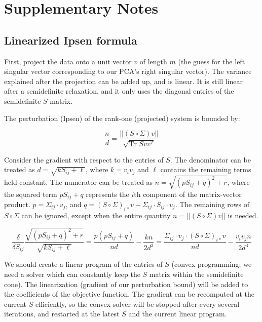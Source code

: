 \documentclass{article}
\begin{document}
\section{Supplementary Notes}

\subsection{Linearized Ipsen formula}

First, project the data onto a unit vector $v$ of length $m$ (the guess for the left singular vector corresponding to our PCA's right singular vector). The variance explained after the projection can be added up, and is linear. It is still linear after a semidefinite relaxation, and it only uses the diagonal entries of the semidefinite $S$ matrix.

The perturbation (Ipsen) of the rank-one (projected) system is bounded by:

$$
\frac{n}{d} = \frac{|| (S \circ \Sigma) v||}{\sqrt{\text{Tr }Svv^T}}
$$

Consider the gradient with respect to the entries of $S$. The denominator can be treated as $d = \sqrt{k S_{ij} + \ell}$, where $k = v_iv_j$ and $\ell$ contains the remaining terms held constant. The numerator can be treated as $n = \sqrt{(pS_{ij} + q)^2 + r}$, where the squared term $pS_{ij} + q$ represents the $i$th component of the matrix-vector product. $p = \Sigma_{ij} \cdot v_j$, and $q = (S \circ \Sigma)_{i*} v - \Sigma_{ij} \cdot S_{ij} \cdot v_j$. The remaining rows of $S \circ \Sigma$ can be ignored, except when the entire quantity $n = ||(S \circ \Sigma)v||$ is needed.

$$
\frac{\delta}{\delta S_{ij}}
\frac{\sqrt{(pS_{ij} + q)^2 + r}}{\sqrt{kS_{ij}+\ell}}
=
\frac{p(pS_{ij}+q)}{nd}
-
\frac{kn}{2d^3}
=
\frac{\Sigma_{ij} \cdot v_j \cdot (S \circ \Sigma)_{i*} v}{nd} - \frac{v_i v_j n}{2d^3}
$$

We should create a linear program of the entries of $S$ (convex programming; we need a solver which can constantly keep the $S$ matrix within the semidefinite cone). The linearization (gradient of our perturbation bound) will be added to the coefficients of the objective function. The gradient can be recomputed at the current $S$ efficiently, so the convex solver will be stopped after every several iterations, and restarted at the latest $S$ and the current linear program.
\end{document}
